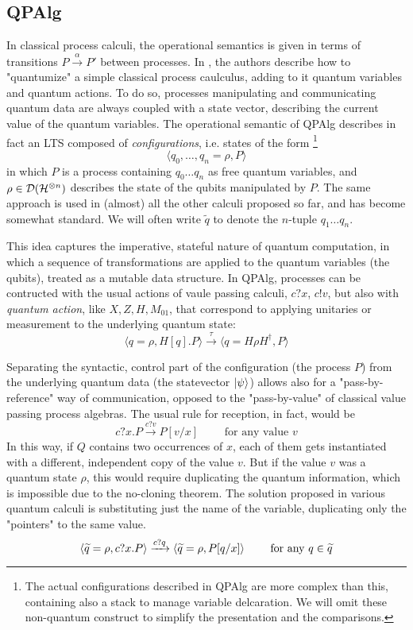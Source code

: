 \subsection{QPAlg}

In classical process calculi, the operational semantics is given in terms of transitions $P \xrightarrow{\alpha} P'$ between processes. In \cite{lalireProcessAlgebraicApproach2004}, the authors describe how to "quantumize" a simple classical process caulculus, adding to it quantum variables and quantum actions. To do so, processes manipulating and communicating quantum data are always coupled with a state vector, describing the current value of the quantum variables. The operational semantic of QPAlg describes in fact an LTS composed of \textit{configurations}, i.e. states of the form \footnote{The actual configurations described in QPAlg are more complex than this, containing also a stack to manage variable delcaration. We will omit these non-quantum construct to simplify the presentation and the comparisons.}
\[
	\langle q_0, \ldots, q_n = \rho, P\rangle
\] 
in which $P$ is a process containing $q_0 \ldots q_n$ as free quantum variables, and $\rho \in \mathcal{D}(\mathcal{H}^{\otimes n})$  describes the state of the qubits manipulated by $P$. The same approach is used in (almost) all the other calculi proposed so far, and has become somewhat standard. We will often write $\widetilde{q}$ to denote the $n$-tuple $q_1 \ldots q_n$. 

This idea captures the imperative, stateful nature of quantum computation, in which a sequence of transformations are applied to the quantum variables (the qubits), treated as a mutable data structure.
In QPAlg, processes can be contructed with the usual actions of vaule passing calculi, $c?x$, $c!v$, but also with \textit{quantum action}, like $X, Z, H, M_{01}$, that correspond to applying unitaries or measurement to the underlying quantum state: \[ \langle q = \rho, H[q].P \rangle \xrightarrow{\tau} \langle q = H\rho H^\dagger, P \rangle\]

Separating the syntactic, control part of the configuration (the process $P$) from the underlying quantum data (the statevector $\ket{\psi}$) allows also for a "pass-by-reference" way of communication, opposed to the "pass-by-value" of classical value passing process algebras.
The usual rule for reception, in fact, would be
\[ c?x.P \xrightarrow{c?v} P[v/x]  \qquad \text{ for any value } v
\]
In this way, if $Q$ contains two occurrences of $x$, each of them gets instantiated with a different, independent copy of the value $v$. But if the value $v$ was a quantum state $\rho$, this would require duplicating the quantum information, which is impossible due to the no-cloning theorem. The solution proposed in various quantum calculi is substituting just the name of the variable, duplicating only the "pointers" to the same value.
\[ \langle \widetilde{q} = \rho, c?x.P \rangle \xrightarrow{c?q} \langle\widetilde{q} = \rho, P[q/x]\rangle \qquad \text{ for any } q \in \widetilde{q}
\]

